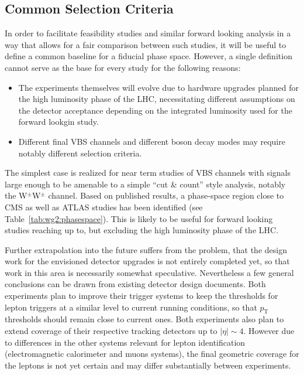 \subsection{Common Selection Criteria}

In order to facilitate feasibility studies and similar forward looking analysis in a way that allows for a fair comparison between such studies, it will be useful to define a common baseline for a fiducial phase space. However, a single definition cannot serve as the base for every study for the following reasons:
\begin{itemize}
\item The experiments themselves will evolve due to hardware upgrades planned for the high luminosity phase of the LHC, necessitating different assumptions on the detector acceptance depending on the integrated luminosity used for the forward lookgin study.
\item Different final VBS channels and different boson decay modes may require notably different selection criteria.
\end{itemize}

The simplest case is realized for near term studies of VBS channels with signals large enough to be amenable to a simple ``cut \& count'' style analysis, notably the W$^\pm$W$^\pm$ channel. Based on published results, a phase-space region close to CMS as well as ATLAS studies has been identified (see Table~\ref{tab:wg2:phasespace}). This is likely to be useful for forward looking studies reaching up to, but excluding the high luminosity phase of the LHC.

Further extrapolation into the future suffers from the problem, that the design work for the envisioned detector upgrades is not entirely completed yet, so that work in this area is necessarily somewhat speculative. Nevertheless a few general conclusions can be drawn from existing detector design documents. Both experiments plan to improve their trigger systems to keep the thresholds for lepton triggers at a similar level to current running conditions, so that $p_{\mathrm{T}}$ thresholds should remain close to current ones. Both experiments also plan to extend coverage of their respective tracking detectors up to $|\eta|\sim 4$. However due to differences in the other systems relevant for lepton identification (electromagnetic calorimeter and muons systems), the final geometric coverage for the leptons is not yet certain and may differ substantially between experiments.

